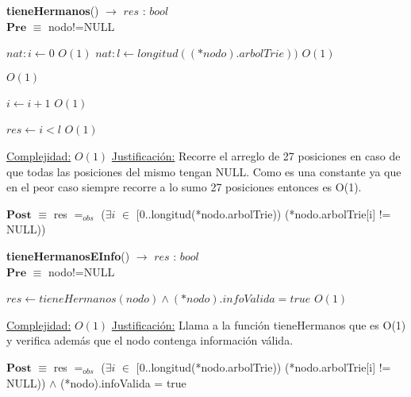 \begin{algorithm}[H]{\textbf{tieneHermanos}() $\to$ $res$ : $bool$}
	{\\ $\textbf{Pre}$ $\equiv$ nodo!=NULL}
	\begin{algorithmic}

		\State $nat: i \gets 0$ \Comment $O(1)$
		\State $nat: l \gets longitud((*nodo).arbolTrie))$ \Comment $O(1)$

		 \Comment $O(1)$

			\State $i \gets i + 1$ \Comment $O(1)$

		\EndWhile

		\State $res \gets i < l$ \Comment $O(1)$

		\medskip
		\Statex \underline{Complejidad:} $O(1)$
		\Statex \underline{Justificación:} Recorre el arreglo de 27 posiciones en caso de que todas las posiciones del mismo tengan NULL. Como es una constante ya que en el peor caso siempre recorre a lo sumo 27 posiciones entonces es O(1).

    \end{algorithmic}
    {$\textbf{Post}$ $\equiv$ res $=_{obs}$ ($\exists i$ $\in$ [0..longitud(*nodo.arbolTrie)) (*nodo.arbolTrie[i] != NULL))}
\end{algorithm}


\begin{algorithm}[H]{\textbf{tieneHermanosEInfo}() $\to$ $res$ : $bool$}
	{\\ $\textbf{Pre}$ $\equiv$ nodo!=NULL}
	\begin{algorithmic}

		\State $res \gets tieneHermanos(nodo) \land (*nodo).infoValida = true$ \Comment $O(1)$

		\medskip
		\Statex \underline{Complejidad:} $O(1)$
		\Statex \underline{Justificación:} Llama a la función tieneHermanos que es O(1) y verifica además que el nodo contenga información válida.

    \end{algorithmic}
    {$\textbf{Post}$ $\equiv$ res $=_{obs}$
($\exists i$ $\in$ [0..longitud(*nodo.arbolTrie))
(*nodo.arbolTrie[i] != NULL)) $\land$ (*nodo).infoValida = true}
\end{algorithm}